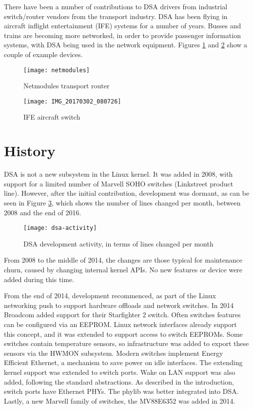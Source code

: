 \documentclass[letterpaper]{article}
\begin{document}
There have been a number of contributions to DSA drivers from
industrial switch/router vendors from the transport industry. DSA has
been flying in aircraft inflight entertainment (IFE) systems for a
number of years. Busses and trains are becoming more networked, in
order to provide passenger information systems, with DSA being used in
the network equipment. Figures \ref{netmodules} and \ref{ife} show a
couple of example devices.

\begin{figure}[ht]
  \centering
  \texttt{[image: netmodules]}
  \caption{Netmodules transport router}
  \label{netmodules}
\end{figure}

\begin{figure}[ht]
  \centering
  \texttt{[image: IMG\_20170302\_080726]}
  \caption{IFE aircraft switch}
  \label{ife}
\end{figure}

\section{History}

DSA is not a new subsystem in the Linux kernel. It was added in 2008,
with support for a limited number of Marvell SOHO switches (Linkstreet
product line). However, after the initial contribution, development
was dormant, as can be seen in Figure \ref{dsa-activity}, which shows
the number of lines changed per month, between 2008 and the end of
2016.

\begin{figure}[ht]
  \centering
  \texttt{[image: dsa-activity]}
  \caption{DSA development activity, in terms of lines changed per
    month}
  \label{dsa-activity}
\end{figure}

From 2008 to the middle of 2014, the changes are those typical for
maintenance churn, caused by changing internal kernel APIs. No new
features or device were added during this time.

From the end of 2014, development recommenced, as part of the Linux
networking push to support hardware offloads and network switches. In
2014 Broadcom added support for their Starfighter 2 switch. Often
switches features can be configured via an EEPROM. Linux network
interfaces already support this concept, and it was extended to
support access to switch EEPROMs. Some switches contain temperature
sensors, so infrastructure was added to export these sensors via the
HWMON subsystem. Modern switches implement Energy Efficient Ethernet,
a mechanism to save power on idle interfaces. The extending kernel
support was extended to switch ports. Wake on LAN support was also
added, following the standard abstractions. As described in the
introduction, switch ports have Ethernet PHYs. The phylib was better
integrated into DSA. Lastly, a new Marvell family of switches, the
MV88E6352 was added in 2014.
\end{document}
